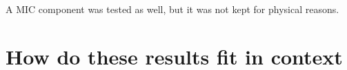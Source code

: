 A MIC component was tested as well, but it was not kept for physical reasons. 


\section{How do these results fit in context}
%		



